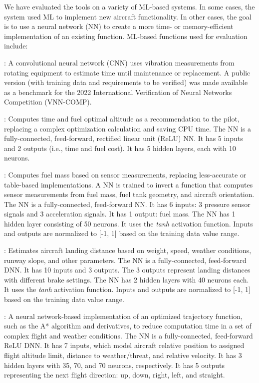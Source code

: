 We have evaluated the tools on a variety of ML-based systems.  In some cases, the system used ML to implement new aircraft functionality.  In other cases, the goal is to use a neural network (NN) to create a more time- or memory-efficient implementation of an existing function.  ML-based functions used for evaluation include:

:  A convolutional neural network (CNN) uses vibration measurements from rotating equipment to estimate time until maintenance or replacement.  A public version (with training data and requirements to be verified) was made available as a benchmark for the 2022 International Verification of Neural Networks Competition (VNN-COMP).


:  Computes time and fuel optimal altitude as a recommendation to the pilot, replacing a complex optimization calculation and saving CPU time. The NN is a fully-connected, feed-forward, rectified linear unit (ReLU) NN. It has 5 inputs and 2 outputs (i.e., time and fuel cost). It has 5 hidden layers, each with 10 neurons.


:  Computes fuel mass based on sensor measurements, replacing less-accurate or table-based implementations.  A NN is trained to invert a function that computes sensor measurements from fuel mass, fuel tank geometry, and aircraft orientation.  The NN is a fully-connected, feed-forward NN. It has 6 inputs: 3 pressure sensor signals and 3 acceleration signals. It has 1 output: fuel mass. The NN has 1 hidden layer consisting of 50 neurons. It uses the \emph{tanh} activation function. Inputs and outputs are normalized to [-1, 1] based on the training data value range.


:  Estimates aircraft landing distance based on weight, speed, weather conditions, runway slope, and other parameters.  The NN is a fully-connected, feed-forward DNN. It has 10 inputs and 3 outputs. The 3 outputs represent landing distances with different brake settings. The NN has 2 hidden layers with 40 neurons each. It uses the \emph{tanh} activation function. Inputs and outputs are normalized to [-1, 1] based on the training data value range.


: A neural network-based implementation of an optimized trajectory function, such as the A* algorithm and derivatives, to reduce computation time in a set of complex flight and weather conditions. The NN is a fully-connected, feed-forward ReLU DNN. It has 7 inputs, which model aircraft relative position to assigned flight altitude limit, distance to weather/threat, and relative velocity. It has 3 hidden layers with 35, 70, and 70 neurons, respectively. It has 5 outputs representing the next flight direction: up, down, right, left, and straight.


